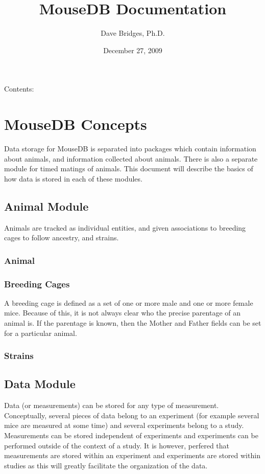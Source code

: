 \documentclass[letterpaper,10pt,english]{sphinxmanual}
\title{MouseDB Documentation}
\date{December 27, 2009}
\author{Dave Bridges, Ph.D.}
\begin{document}
\maketitle
\tableofcontents
\hypertarget{--doc-index}{}


Contents:

\resetcurrentobjects
\hypertarget{--doc-concepts}{}

\chapter{MouseDB Concepts}

Data storage for MouseDB is separated into packages which contain information about animals, and information collected about animals.  There is also a separate module for timed matings of animals.  This document will describe the basics of how data is stored in each of these modules.


\section{Animal Module}

Animals are tracked as individual entities, and given associations to breeding cages to follow ancestry, and strains.


\subsection{Animal}


\subsection{Breeding Cages}

A breeding cage is defined as a set of one or more male and one or more female mice.  Because of this, it is not always clear who the precise parentage of an animal is.  If the parentage is known, then the Mother and Father fields can be set for a particular animal.


\subsection{Strains}


\section{Data Module}

Data (or measurements) can be stored for any type of measurement.  Conceptually, several pieces of data belong to an experiment (for example several mice are measured at some time) and several experiments belong to a study.  Measurements can be stored independent of experiments and experiments can be performed outside of the context of a study.  It is however, perfered that measurements are stored within an experiment and experiments are stored within studies as this will greatly facilitate the organization of the data.
\end{document}
